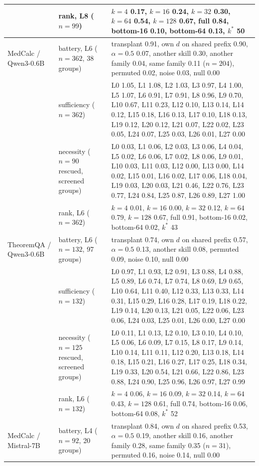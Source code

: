 \begin{tabular}{@{}p{}p{}p{}@{}}
 & rank, L8 ($n=99$) & $k{=}4$ 0.17, $k{=}16$ 0.24, $k{=}32$ 0.30, $k{=}64$ 0.54, $k{=}128$ 0.67, full 0.84, bottom-16 0.10, bottom-64 0.13, $k^{*}$ 50 \\
\midrule
MedCalc / Qwen3-0.6B & battery, L6 ($n=362$, 38 groups) & transplant 0.91, own $d$ on shared prefix 0.90, $\alpha{=}0.5$ 0.07, another skill 0.30, another family 0.04, same family 0.11 ($n=204$), permuted 0.02, noise 0.03, null 0.00 \\
 & sufficiency ($n=362$) & L0 1.05, L1 1.08, L2 1.03, L3 0.97, L4 1.00, L5 1.07, L6 0.91, L7 0.91, L8 0.96, L9 0.70, L10 0.67, L11 0.23, L12 0.10, L13 0.14, L14 0.12, L15 0.18, L16 0.13, L17 0.10, L18 0.13, L19 0.12, L20 0.12, L21 0.07, L22 0.02, L23 0.05, L24 0.07, L25 0.03, L26 0.01, L27 0.00 \\
 & necessity ($n=90$ rescued, screened groups) & L0 0.03, L1 0.06, L2 0.03, L3 0.06, L4 0.04, L5 0.02, L6 0.06, L7 0.02, L8 0.06, L9 0.01, L10 0.03, L11 0.03, L12 0.00, L13 0.00, L14 0.02, L15 0.01, L16 0.02, L17 0.06, L18 0.04, L19 0.03, L20 0.03, L21 0.46, L22 0.76, L23 0.77, L24 0.84, L25 0.87, L26 0.89, L27 1.00 \\
 & rank, L6 ($n=362$) & $k{=}4$ 0.01, $k{=}16$ 0.00, $k{=}32$ 0.12, $k{=}64$ 0.79, $k{=}128$ 0.67, full 0.91, bottom-16 0.02, bottom-64 0.02, $k^{*}$ 43 \\
\midrule
TheoremQA / Qwen3-0.6B & battery, L6 ($n=132$, 97 groups) & transplant 0.74, own $d$ on shared prefix 0.57, $\alpha{=}0.5$ 0.13, another skill 0.08, permuted 0.09, noise 0.10, null 0.00 \\
 & sufficiency ($n=132$) & L0 0.97, L1 0.93, L2 0.91, L3 0.88, L4 0.88, L5 0.89, L6 0.74, L7 0.74, L8 0.69, L9 0.65, L10 0.64, L11 0.40, L12 0.33, L13 0.33, L14 0.31, L15 0.29, L16 0.28, L17 0.19, L18 0.22, L19 0.14, L20 0.13, L21 0.05, L22 0.06, L23 0.06, L24 0.03, L25 0.01, L26 0.00, L27 0.00 \\
 & necessity ($n=125$ rescued, screened groups) & L0 0.11, L1 0.13, L2 0.10, L3 0.10, L4 0.10, L5 0.06, L6 0.09, L7 0.15, L8 0.17, L9 0.14, L10 0.14, L11 0.11, L12 0.20, L13 0.18, L14 0.18, L15 0.21, L16 0.27, L17 0.25, L18 0.34, L19 0.33, L20 0.54, L21 0.66, L22 0.86, L23 0.88, L24 0.90, L25 0.96, L26 0.97, L27 0.99 \\
 & rank, L6 ($n=132$) & $k{=}4$ 0.06, $k{=}16$ 0.09, $k{=}32$ 0.14, $k{=}64$ 0.43, $k{=}128$ 0.61, full 0.74, bottom-16 0.06, bottom-64 0.08, $k^{*}$ 52 \\
\midrule
MedCalc / Mistral-7B & battery, L4 ($n=92$, 20 groups) & transplant 0.84, own $d$ on shared prefix 0.53, $\alpha{=}0.5$ 0.19, another skill 0.16, another family 0.28, same family 0.35 ($n=31$), permuted 0.16, noise 0.14, null 0.00 \\

\end{tabular}
